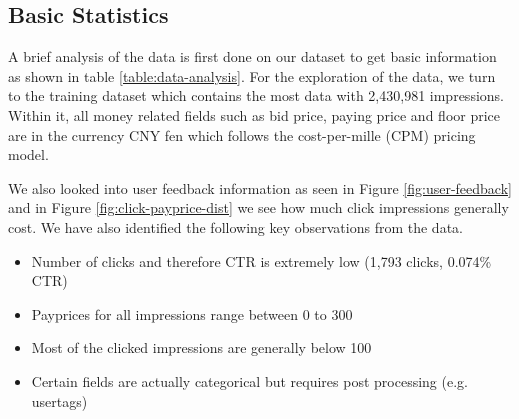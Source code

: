 \documentclass{sig-alternate-05-2015}
\begin{document}
\subsection{Basic Statistics}
A brief analysis of the data is first done on our dataset to get basic information as shown in table \ref{table:data-analysis}. For the exploration of the data, we turn to the training dataset which contains the most data with 2,430,981 impressions. Within it, all money related fields such as bid price, paying price and floor price are in the currency CNY fen which follows the cost-per-mille (CPM) pricing model.

We also looked into user feedback information as seen in Figure \ref{fig:user-feedback} and in Figure \ref{fig:click-payprice-dist} we see how much click impressions generally cost. We have also identified the following key observations from the data.

\begin{itemize}
    \item Number of clicks and therefore CTR is extremely low (1,793 clicks, 0.074\% CTR)
    \item Payprices for all impressions range between 0 to 300
    \item Most of the clicked impressions are generally below 100
    \item Certain fields are actually categorical but requires post processing (e.g. usertags)
\end{itemize}
\end{document}
